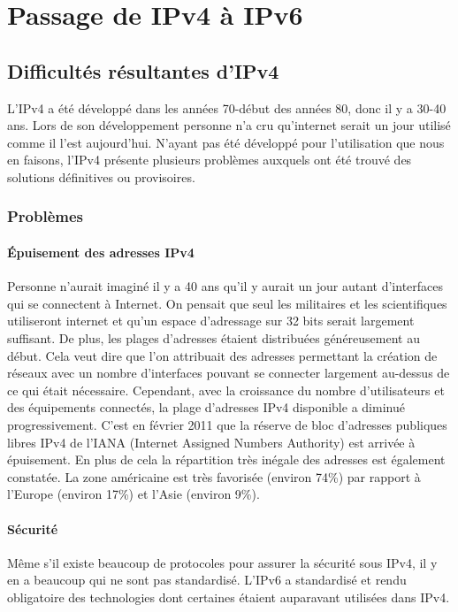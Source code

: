 \section{Passage de IPv4 à IPv6}
\label{sec:passage-IP4-IP6}

\subsection{Difficultés résultantes d'IPv4}
L'IPv4 a été développé dans les années 70-début des années 80, donc il y a 30-40 ans.
Lors de son développement personne n'a cru qu'internet serait un jour utilisé comme il l'est 
aujourd'hui. N'ayant pas été développé pour l'utilisation que nous en faisons, l'IPv4 présente 
plusieurs problèmes auxquels ont été trouvé des solutions définitives ou provisoires.

\subsubsection{Problèmes}

\paragraph{Épuisement des adresses IPv4}

Personne n'aurait imaginé il y a 40 ans qu'il y aurait un jour autant d'interfaces qui se connectent à 
Internet. On pensait que seul les militaires et les scientifiques utiliseront 
internet et qu'un espace d'adressage sur 32 bits serait largement suffisant. 
De plus, les plages d'adresses étaient distribuées généreusement au début. 
Cela veut dire que l'on attribuait des adresses permettant la création de réseaux 
avec un nombre d'interfaces pouvant se connecter largement au-dessus de ce qui était 
nécessaire.
Cependant, avec la croissance du nombre d'utilisateurs et des équipements connectés, 
la plage d'adresses IPv4 disponible a diminué progressivement. C'est en février 2011 
que la réserve de bloc d'adresses publiques libres IPv4 de l'IANA (Internet Assigned 
Numbers Authority) est arrivée à épuisement. En plus de cela la répartition très inégale des adresses est également constatée. 
La zone américaine est très favorisée (environ 74\%) par rapport à l'Europe (environ 17\%) et l'Asie (environ 9\%).


\paragraph{Sécurité}
Même s'il existe beaucoup de protocoles pour assurer la sécurité sous IPv4, il y en a 
beaucoup qui ne sont pas standardisé. L'IPv6 a standardisé et rendu obligatoire des 
technologies dont certaines étaient auparavant utilisées dans IPv4. 


